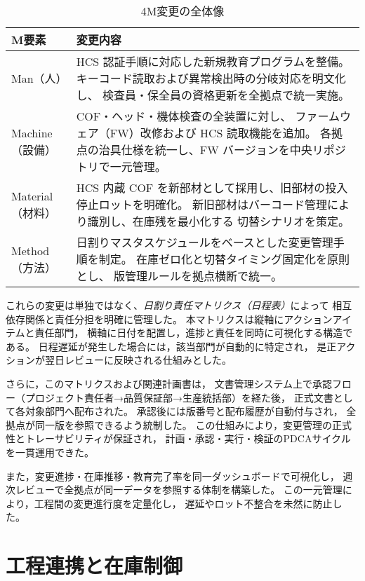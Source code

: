 \documentclass[journal,twocolumn]{IEEEtran}
\begin{document}
\begin{table}[t]
\caption{4M変更の全体像}
\label{tab:4m}
\centering
\begin{tabularx}{\columnwidth}{@{}l X@{}}
\toprule
M要素 & 変更内容 \\
\midrule
Man（人） &
HCS 認証手順に対応した新規教育プログラムを整備。
キーコード読取および異常検出時の分岐対応を明文化し、
検査員・保全員の資格更新を全拠点で統一実施。 \\[2pt]

Machine（設備） &
COF・ヘッド・機体検査の全装置に対し、
ファームウェア（FW）改修および HCS 読取機能を追加。
各拠点の治具仕様を統一し、FW バージョンを中央リポジトリで一元管理。 \\[2pt]

Material（材料） &
HCS 内蔵 COF を新部材として採用し、旧部材の投入停止ロットを明確化。
新旧部材はバーコード管理により識別し、在庫残を最小化する
切替シナリオを策定。 \\[2pt]

Method（方法） &
日割りマスタスケジュールをベースとした変更管理手順を制定。
在庫ゼロ化と切替タイミング固定化を原則とし、
版管理ルールを拠点横断で統一。 \\
\bottomrule
\end{tabularx}
\end{table}

これらの変更は単独ではなく、\emph{日割り責任マトリクス（日程表）}によって
相互依存関係と責任分担を明確に管理した。
本マトリクスは縦軸にアクションアイテムと責任部門，
横軸に日付を配置し，進捗と責任を同時に可視化する構造である。
日程遅延が発生した場合には，該当部門が自動的に特定され，
是正アクションが翌日レビューに反映される仕組みとした。

さらに，このマトリクスおよび関連計画書は，
文書管理システム上で承認フロー（プロジェクト責任者→品質保証部→生産統括部）を経た後，
正式文書として各対象部門へ配布された。
承認後には版番号と配布履歴が自動付与され，
全拠点が同一版を参照できるよう統制した。
この仕組みにより，変更管理の正式性とトレーサビリティが保証され，
計画・承認・実行・検証のPDCAサイクルを一貫運用できた。

また，変更進捗・在庫推移・教育完了率を同一ダッシュボードで可視化し，
週次レビューで全拠点が同一データを参照する体制を構築した。
この一元管理により，工程間の変更進行度を定量化し，
遅延やロット不整合を未然に防止した。

\section{工程連携と在庫制御}
\end{document}
